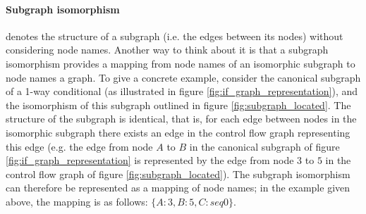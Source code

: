 \paragraph{Subgraph isomorphism} denotes the structure of a subgraph (i.e. the edges between its nodes) without considering node names. Another way to think about it is that a subgraph isomorphism provides a mapping from node names of an isomorphic subgraph to node names a graph. To give a concrete example, consider the canonical subgraph of a 1-way conditional (as illustrated in figure \ref{fig:if_graph_representation}), and the isomorphism of this subgraph outlined in figure \ref{fig:subgraph_located}. The structure of the subgraph is identical, that is, for each edge between nodes in the isomorphic subgraph there exists an edge in the control flow graph representing this edge (e.g. the edge from node $A$ to $B$ in the canonical subgraph of figure \ref{fig:if_graph_representation} is represented by the edge from node $3$ to $5$ in the control flow graph of figure \ref{fig:subgraph_located}). The subgraph isomorphism can therefore be represented as a mapping of node names; in the example given above, the mapping is as follows: $\{A: 3, B: 5, C: seq0\}$.

